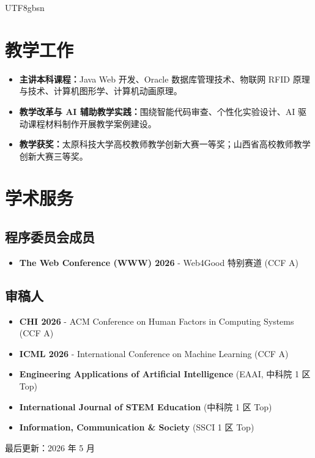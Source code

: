 \documentclass[a4paper,10pt]{article}
\newcommand{\cvlabel}[1]{\textbf{#1}}
\begin{document}
\begin{CJK*}{UTF8}{gbsn}
\section*{教学工作}
\begin{itemize}
  \item \cvlabel{主讲本科课程：}Java Web 开发、Oracle 数据库管理技术、物联网 RFID 原理与技术、计算机图形学、计算机动画原理。
  \item \cvlabel{教学改革与 AI 辅助教学实践：}围绕智能代码审查、个性化实验设计、AI 驱动课程材料制作开展教学案例建设。
  \item \cvlabel{教学获奖：}太原科技大学高校教师教学创新大赛一等奖；山西省高校教师教学创新大赛三等奖。
\end{itemize}

\section*{学术服务}
\subsection*{程序委员会成员}
\begin{itemize}
  \item \textbf{The Web Conference (WWW) 2026} - Web4Good 特别赛道 (CCF A)
\end{itemize}

\subsection*{审稿人}
\begin{itemize}
  \item \textbf{CHI 2026} - ACM Conference on Human Factors in Computing Systems (CCF A)
  \item \textbf{ICML 2026} - International Conference on Machine Learning (CCF A)
  \item \textbf{Engineering Applications of Artificial Intelligence} (EAAI, 中科院 1 区 Top)
  \item \textbf{International Journal of STEM Education} (中科院 1 区 Top)
  \item \textbf{Information, Communication \& Society} (SSCI 1 区 Top)
\end{itemize}

\vfill
\begin{center}
  \small\color{cvgray} 最后更新：2026 年 5 月
\end{center}

\ifPDFTeX
\end{CJK*}
\fi
\end{document}
